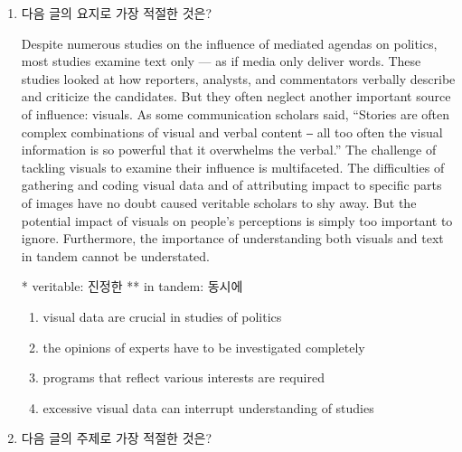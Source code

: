 \documentclass[a4paper, twocolumn]{oblivoir}
\begin{document}
    \pagebreak
    \begin{enumerate}
        \item 다음 글의 요지로 가장 적절한 것은?
        
        Despite numerous studies on the influence of mediated
        agendas on politics, most studies examine text only --- as if
        media only deliver words. These studies looked at how
        reporters, analysts, and commentators verbally describe and
        criticize the candidates. But they often neglect another
        important source of influence: visuals. As some
        communication scholars said, “Stories are often complex
        combinations of visual and verbal content ⎯ all too often the
        visual information is so powerful that it overwhelms the
        verbal.” The challenge of tackling visuals to examine their
        influence is multifaceted. The difficulties of gathering and
        coding visual data and of attributing impact to specific parts
        of images have no doubt caused veritable scholars to shy
        away. But the potential impact of visuals on people’s
        perceptions is simply too important to ignore. Furthermore,
        the importance of understanding both visuals and text in
        tandem cannot be understated. 
        \begin{flushright}
            \small{* veritable: 진정한 ** in tandem: 동시에}
        \end{flushright}
        \begin{enumerate}
            \item visual data are crucial in studies of politics
            \item the opinions of experts have to be investigated completely
            \item programs that reflect various interests are required
            \item excessive visual data can interrupt understanding of studies 
        \end{enumerate}


        \pagebreak
        \thispagestyle{thirdstyle}
    
        \item 다음 글의 주제로 가장 적절한 것은?
        

\end{enumerate}
\end{document}
